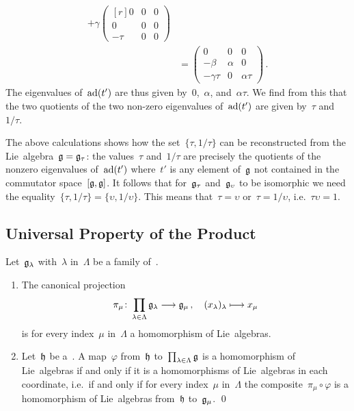 \begin{example}
\begin{align*}
		+
		\gamma
		\begin{pmatrix*}[r]
			0     & 0 & 0 \\
			0     & 0 & 0 \\
			-\tau & 0 & 0
		\end{pmatrix*}
		\\
		&=
		\begin{pmatrix}
			 0          & 0       & 0           \\
			-\beta      & \alpha  & 0           \\
			-\gamma\tau & 0       & \alpha \tau
		\end{pmatrix} \,.
	\end{align*}
	The eigenvalues of~$\operatorname{ad}(t')$ are thus given by~$0$,~$\alpha$, and~$\alpha \tau$.
	We find from this that the two quotients of the two non-zero eigenvalues of~$\operatorname{ad}(t')$ are given by~$\tau$ and~$1 / \tau$.

	The above calculations shows how the set~$\{ \tau, 1 / \tau \}$ can be reconstructed from the Lie~algebra~$\mathfrak{g} = \mathfrak{g}_\tau$:
	the values~$\tau$ and~$1/\tau$ are precisely the quotients of the nonzero eigenvalues of~$\operatorname{ad}(t')$ where~$t'$ is any element of~$\mathfrak{g}$ not contained in the commutator space~$[\mathfrak{g}, \mathfrak{g}]$.
	It follows that for~$\mathfrak{g}_\tau$ and~$\mathfrak{g}_\upsilon$ to be isomorphic we need the equality~$\{ \tau , 1/\tau \} = \{ \upsilon, 1/\upsilon \}$.
	This means that~$\tau = \upsilon$ or~$\tau = 1 / \upsilon$, i.e.~$\tau \upsilon = 1$.
\end{example}


\subsection{Universal Property of the Product}


\begin{proposition}
	\label{products of lie algebras}
	Let~$\mathfrak{g}_\lambda$ with~$\lambda$ in~$\Lambda$ be a family of~\liealgebras{$\kf$}.
	\begin{enumerate}
		\item
			The canonical projection
			\[
			 \pi_\mu
			 \colon
			 \prod_{\lambda \in \Lambda} \glie_\lambda
			 \to
			 \glie_\mu \,,
			 \quad
			 ( x_\lambda )_\lambda
			 \mapsto
			 x_\mu
			\]
			is for every index~$\mu$ in~$\Lambda$ a homomorphism of Lie~algebras.
		\item
			Let~$\mathfrak{h}$ be a~\liealgebra{$\kf$}.
			A map~$\varphi$ from~$\mathfrak{h}$ to~$\prod_{\lambda \in \Lambda} \mathfrak{g}$ is a homomorphism of Lie~algebras if and only if it is a homomorphisms of Lie~algebras in each coordinate, i.e.\ if and only if for every index~$\mu$ in~$\Lambda$ the composite~$\pi_\mu \circ \varphi$ is a homomorphism of Lie~algebras from~$\mathfrak{h}$ to~$\mathfrak{g}_\mu$.
		\qed
	\end{enumerate}
\end{proposition}


